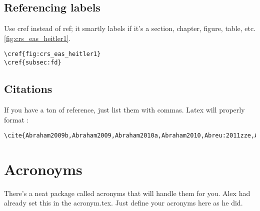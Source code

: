 \subsection{Referencing labels}

Use cref instead of ref; it smartly labels if it's a section, chapter, figure, table, etc. \cref{fig:crs_eas_heitler1}.
%
\begin{lstlisting}
\cref{fig:crs_eas_heitler1}
\cref{subsec:fd}
\end{lstlisting}



\subsection{Citations}

If you have a ton of reference, just list them with commas. Latex will properly format \cite{Abraham2009b,Abraham2009,Abraham2010a,Abraham2010,Abreu:2011zze,Abreu:2011zzd,Abreu:2011vm,Abreu:2011ki,Abreu:2011fb,Settimo:2012zz,Auger:2012yc,Auger:2012an,Acounis:2012dg,Abreu:2012zz,Abreu:2012zg,Abreu:2012ybu,Abreu:2012pi,Abreu:2012oza,Abreu:2012aniso,Abreu:2011md,Abreu:2013zbq,Abreu:2013qtw,Abreu:2013qfa,Abreu:2013kif,Abreu:2013env,Aab:2014qva,Aab:2014pza,Aab:2014kda,Aab:2014ila,Aab:2014gua,Aab:2014esa,Aab:2014dua,Aab:2014dha,Aab:2014caa,Aab:2014bha,Aab:2014aea,ThePierreAuger:2014nja,PierreAuger:2014yba,Aab2015a,Aab2015,Aab:2015kma}:
\begin{lstlisting}
\cite{Abraham2009b,Abraham2009,Abraham2010a,Abraham2010,Abreu:2011zze,Abreu:2011zzd,Abreu:2011vm,Abreu:2011ki,Abreu:2011fb,Settimo:2012zz,Auger:2012yc,Auger:2012an,Acounis:2012dg,Abreu:2012zz,Abreu:2012zg,Abreu:2012ybu,Abreu:2012pi,Abreu:2012oza,Abreu:2012aniso,Abreu:2011md,Abreu:2013zbq,Abreu:2013qtw,Abreu:2013qfa,Abreu:2013kif,Abreu:2013env,Aab:2014qva,Aab:2014pza,Aab:2014kda,Aab:2014ila,Aab:2014gua,Aab:2014esa,Aab:2014dua,Aab:2014dha,Aab:2014caa,Aab:2014bha,Aab:2014aea,ThePierreAuger:2014nja,PierreAuger:2014yba,Aab2015a,Aab2015,Aab:2015kma}
\end{lstlisting}



\section{Acronoyms}

There's a neat package called acronyms that will handle them for you. Alex had already set this in the acronym.tex. Just define your acronyms here as he did.

